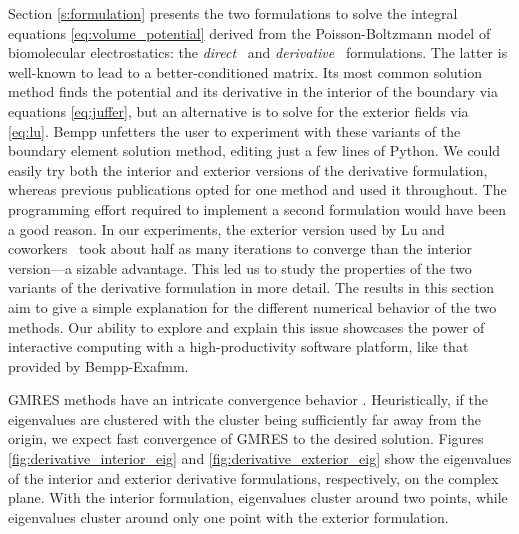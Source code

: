 Section \ref{s:formulation} presents the two formulations to solve the integral equations  \eqref{eq:volume_potential} derived from the Poisson-Boltzmann model of biomolecular electrostatics: 
the \emph{direct}~\cite{YoonLenhoff1990}  and \emph{derivative}~\cite{JufferETal1991} formulations.
The latter is well-known to lead to a better-conditioned matrix.
Its most common solution method finds the potential and its derivative in the interior of the boundary via equations \eqref{eq:juffer}, but an alternative is to solve for the exterior fields via \eqref{eq:lu}.
Bempp unfetters the user to experiment with these variants of the boundary element solution method, editing just a few lines of Python.
We could easily try both the interior and exterior versions of the derivative formulation, whereas previous publications opted for one method and used it throughout.
The programming effort required to implement a second formulation would have been a good reason.
In our experiments, the exterior version used by Lu and coworkers~\cite{LuETal2006,LuETal2009,ZhangETal2019} took about half as many iterations to converge than the interior version---a sizable advantage.
This led us to study the properties of the two variants of the derivative formulation in more detail.
The results in this section aim to give a simple explanation for the different numerical behavior of the two methods.
Our ability to explore and explain this issue showcases the power of interactive computing with a high-productivity software platform, like that provided by Bempp-Exafmm.

GMRES methods have an intricate convergence behavior \cite{mark1999a}.
Heuristically, if the eigenvalues are clustered with the cluster being sufficiently far away from the origin, we expect fast convergence of GMRES to the desired solution.
Figures \ref{fig:derivative_interior_eig} and \ref{fig:derivative_exterior_eig} show the eigenvalues of the interior and exterior derivative formulations, respectively, on the complex plane.
With the interior formulation, eigenvalues cluster around two points, while eigenvalues cluster around only one point with the exterior formulation.

